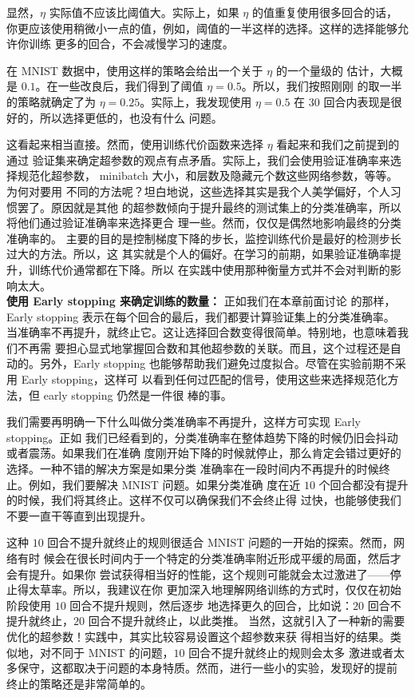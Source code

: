 显然，$\eta$ 实际值不应该比阈值大。实际上，如果 $\eta$ 的值重复使用很多回合的话，
你更应该使用稍微小一点的值，例如，阈值的一半这样的选择。这样的选择能够允许你训练
更多的回合，不会减慢学习的速度。

在 MNIST 数据中，使用这样的策略会给出一个关于\learningrate{} $\eta$ 的一个量级的
估计，大概是 $0.1$。在一些改良后，我们得到了阈值 $\eta=0.5$。所以，我们按照刚刚
的取一半的策略就确定了\learningrate{}为 $\eta=0.25$。实际上，我发现使用
$\eta=0.5$ 在 $30$ 回合内表现是很好的，所以选择更低的\learningrate{}，也没有什么
问题。

这看起来相当直接。然而，使用训练代价函数来选择 $\eta$ 看起来和我们之前提到的通过
验证集来确定超参数的观点有点矛盾。实际上，我们会使用验证准确率来选择规范化超参数，
minibatch 大小，和层数及隐藏元个数这些网络参数，等等。为何对\learningrate{}要用
不同的方法呢？坦白地说，这些选择其实是我个人美学偏好，个人习惯罢了。原因就是其他
的超参数倾向于提升最终的测试集上的分类准确率，所以将他们通过验证准确率来选择更合
理一些。然而，\learningrate{}仅仅是偶然地影响最终的分类准确率的。\learningrate{}%
主要的目的是控制梯度下降的步长，监控训练代价是最好的检测步长过大的方法。所以，这
其实就是个人的偏好。在学习的前期，如果验证准确率提升，训练代价通常都在下降。所以
在实践中使用那种衡量方式并不会对判断的影响太大。\\

\textbf{使用 Early stopping 来确定训练的\epochs{}数量：} 正如我们在本章前面讨论
的那样，Early stopping 表示在每个回合的最后，我们都要计算验证集上的分类准确率。
当准确率不再提升，就终止它。这让选择回合数变得很简单。特别地，也意味着我们不再需
要担心显式地掌握回合数和其他超参数的关联。而且，这个过程还是自动的。另外，Early
stopping 也能够帮助我们避免过度拟合。尽管在实验前期不采用 Early stopping，这样可
以看到任何过匹配的信号，使用这些来选择规范化方法，但 early stopping 仍然是一件很
棒的事。

我们需要再明确一下什么叫做分类准确率不再提升，这样方可实现 Early stopping。正如
我们已经看到的，分类准确率在整体趋势下降的时候仍旧会抖动或者震荡。如果我们在准确
度刚开始下降的时候就停止，那么肯定会错过更好的选择。一种不错的解决方案是如果分类
准确率在一段时间内不再提升的时候终止。例如，我们要解决 MNIST 问题。如果分类准确
度在近 $10$ 个回合都没有提升的时候，我们将其终止。这样不仅可以确保我们不会终止得
过快，也能够使我们不要一直干等直到出现提升。

这种 $10$ 回合不提升就终止的规则很适合 MNIST 问题的一开始的探索。然而，网络有时
候会在很长时间内于一个特定的分类准确率附近形成平缓的局面，然后才会有提升。如果你
尝试获得相当好的性能，这个规则可能就会太过激进了——停止得太草率。所以，我建议在你
更加深入地理解网络训练的方式时，仅仅在初始阶段使用 $10$ 回合不提升规则，然后逐步
地选择更久的回合，比如说：$20$ 回合不提升就终止，$20$ 回合不提升就终止，以此类推。
当然，这就引入了一种新的需要优化的超参数！实践中，其实比较容易设置这个超参数来获
得相当好的结果。类似地，对不同于 MNIST 的问题，$10$ 回合不提升就终止的规则会太多
激进或者太多保守，这都取决于问题的本身特质。然而，进行一些小的实验，发现好的提前
终止的策略还是非常简单的。

